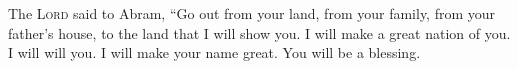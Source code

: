 
\begin{inparaenum}
     The \textsc{Lord} said to Abram, ``Go out from your land, from your family, from your father's house, to the land that I will show you.%
     I will make a great nation of you. I will will you. I will make your name great. You will be a blessing.%
    
\end{inparaenum}
